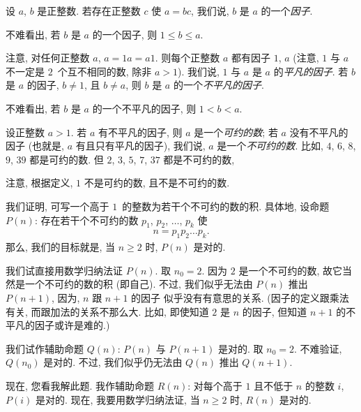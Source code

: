 \documentclass[../libro.tex]{subfiles}
\begin{document}
\begin{example}
    设 \(a\), \(b\) 是正整数.
    若存在正整数 \(c\) 使 \(a = bc\),
    我们说, \(b\) 是 \(a\) 的一个\emph{因子}.

    不难看出, 若 \(b\) 是 \(a\) 的一个因子,
    则 \(1 \leq b \leq a\).

    注意, 对任何正整数 \(a\),
    \(a = 1a = a1\).
    则每个正整数 \(a\) 都有因子 \(1\), \(a\)
    (注意, \(1\) 与 \(a\) 不一定是 \(2\)~个互不相同的数,
    除非 \(a > 1\)).
    我们说, \(1\) 与 \(a\) 是 \(a\) 的\emph{平凡的因子}.
    若 \(b\) 是 \(a\) 的因子,
    \(b \neq 1\),
    且 \(b \neq a\),
    则 \(b\) 是 \(a\) 的一个\emph{不平凡的因子}.

    不难看出, 若 \(b\) 是 \(a\) 的一个不平凡的因子,
    则 \(1 < b < a\).

    设正整数 \(a > 1\).
    若 \(a\) 有不平凡的因子,
    则 \(a\) 是一个\emph{可约的数};
    若 \(a\) 没有不平凡的因子
    (也就是, \(a\) 有且只有平凡的因子),
    我们说, \(a\) 是一个\emph{不可约的数}.
    比如, \(4\), \(6\), \(8\), \(9\), \(39\) 都是可约的数.
    但 \(2\), \(3\), \(5\), \(7\), \(37\) 都是不可约的数,

    注意, 根据定义,
    \(1\) 不是可约的数, 且不是不可约的数.

    我们证明,
    可写一个高于 \(1\)~的整数为若干个不可约的数的积.
    具体地, 设命题 \(P(n)\):
    存在若干个不可约的数
    \(p_1\), \(p_2\), \(\dots\), \(p_k\) 使
    \begin{align*}
        n = p_1 p_2 \dots p_k.
    \end{align*}
    那么, 我们的目标就是,
    当 \(n \geq 2\) 时,
    \(P(n)\) 是对的.

    我们试直接用数学归纳法证 \(P(n)\).
    取 \(n_0 = 2\).
    因为 \(2\) 是一个不可约的数,
    故它当然是一个不可约的数的积 (即自己).
    不过, 我们似乎无法由
    \(P(n)\) 推出 \(P(n+1)\),
    因为, \(n\) 跟 \(n+1\) 的因子%
    似乎没有有意思的关系.
    (因子的定义跟乘法有关, %
    而跟加法的关系不那么大.
    比如, 即使知道 \(2\) 是 \(n\) 的因子,
    但知道 \(n+1\) 的不平凡的因子或许是难的.) %

    我们试作辅助命题 \(Q(n)\):
    \(P(n)\) 与 \(P(n+1)\) 是对的.
    取 \(n_0 = 2\).
    不难验证, \(Q(n_0)\) 是对的.
    不过, 我们似乎仍无法由
    \(Q(n)\) 推出 \(Q(n+1)\).

    现在, 您看我解此题.
    我作辅助命题 \(R(n)\):
    对每个高于 \(1\) 且不低于 \(n\) 的整数 \(i\),
    \(P(i)\) 是对的.
    现在, 我要用数学归纳法证,
    当 \(n \geq 2\) 时, \(R(n)\) 是对的.


\end{example}
\end{document}
